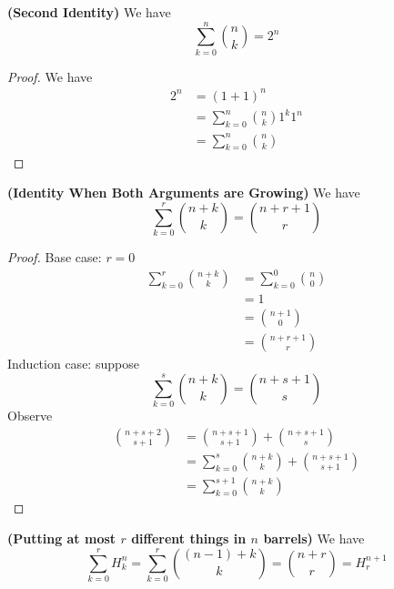\documentclass{report}
\begin{document}
\begin{theorem}
\label{0.1.3}
\textbf{(Second Identity)} We have
\begin{equation*}
\sum_{k=0}^n \binom{n}{k}=2^n
\end{equation*}
\end{theorem}
\begin{proof}
We have 
\begin{align*}
2^n&=(1+1)^n\\
&=\sum_{k=0}^n \binom{n}{k}1^k 1^n\\
&=\sum_{k=0}^n \binom{n}{k}
\end{align*}
\end{proof}
\begin{theorem}
\textbf{(Identity When Both Arguments are Growing)} We have 
\begin{equation*}
\sum_{k=0}^r \binom{n+k}{k}=\binom{n+r+1}{r}
\end{equation*}
\end{theorem}
\begin{proof}
Base case: $r=0$
 \begin{align*}
\sum_{k=0}^r \binom{n+k}{k}&=\sum_{k=0}^0 \binom{n}{0}\\
&=1\\
&=\binom{n+1}{0}\\
&=\binom{n+r+1}{r}
\end{align*}
Induction case: suppose 
\begin{equation*}
\sum_{k=0}^s \binom{n+k}{k}=\binom{n+s+1}{s}
\end{equation*}
Observe
\begin{align*}
\binom{n+s+2}{s+1}&=\binom{n+s+1}{s+1}+\binom{n+s+1}{s}\\
&=\sum_{k=0}^s \binom{n+k}{k}+\binom{n+s+1}{s+1}\\
&=\sum_{k=0}^{s+1} \binom{n+k}{k}
\end{align*}
\end{proof}
\begin{corollary}
\textbf{(Putting at most $r$ different things in  $n$ barrels)} We have
\begin{equation*}
\sum_{k=0}^r H^{n}_k=\sum_{k=0}^r \binom{\left(n-1 \right)+ k}{k}=\binom{n+r}{r}=H_r^{n+1}
\end{equation*}
\end{corollary}
\end{document}
